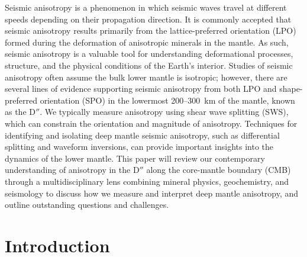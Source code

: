 \documentclass{standard}
\begin{document}
Seismic anisotropy is a phenomenon in which seismic waves travel at different speeds depending on their propagation direction. It is commonly accepted that seismic anisotropy results primarily from the lattice-preferred orientation (LPO) formed during the deformation of anisotropic minerals in the mantle. As such, seismic anisotropy is a valuable tool for understanding deformational processes, structure, and the physical conditions of the Earth's interior.
Studies of seismic anisotropy often assume the bulk lower mantle is isotropic; however, there are several lines of evidence supporting seismic anisotropy from both LPO and shape-preferred orientation (SPO) in the lowermost 200--300~km of the mantle, known as the D$''$.
We typically measure anisotropy using shear wave splitting (SWS), which can constrain the orientation and magnitude of anisotropy. Techniques for identifying and isolating deep mantle seismic anisotropy, such as differential splitting and waveform inversions, can provide important insights into the dynamics of the lower mantle.
This paper will review our contemporary understanding of anisotropy in the D$''$ along the core-mantle boundary (CMB) through a multidisciplinary lens combining mineral physics, geochemistry, and seismology to discuss how we measure and interpret deep mantle anisotropy, and outline outstanding questions and challenges.

\newpage
{}
\section{Introduction}

\end{document}
